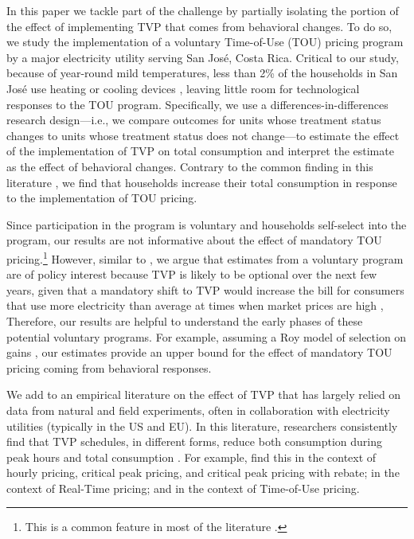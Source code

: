 \documentclass[12pt]{article}
\begin{document}
In this paper we tackle part of the challenge by partially isolating the portion of the effect of implementing TVP that comes from behavioral changes. To do so, we study the implementation of a voluntary Time-of-Use (TOU) pricing program by a major electricity utility serving San José, Costa Rica. Critical to our study, because of year-round mild temperatures, less than 2\% of the households in San José use heating or cooling devices \citep{ministeriodeambienteyenergiaEstudioParaCaracterizacion2019}, leaving little room for technological responses to the TOU program. Specifically, we use a differences-in-differences research design---i.e., we compare outcomes for units whose treatment status changes to units whose treatment status does not change---to estimate the effect of the implementation of TVP on total consumption and interpret the estimate as the effect of behavioral changes. Contrary to the common finding in this literature \citep{faruquiHouseholdResponseDynamic2010,minabadtke-berkowPrimerTimevariantElectricity2015,duttaLiteratureReviewDynamic2017}, we find that households increase their total consumption in response to the implementation of TOU pricing.

Since participation in the program is voluntary and households self-select into the program, our results are not informative about the effect of mandatory TOU pricing.\footnote{This is a common feature in most of the literature \citep{faruquiHouseholdResponseDynamic2010,minabadtke-berkowPrimerTimevariantElectricity2015}.} However, similar to \citet{allcottRethinkingRealtimeElectricity2011}, we argue that estimates from a voluntary program are of policy interest because TVP is likely to be optional over the next few years, given that a mandatory shift to TVP would increase the bill for consumers that use more electricity than average at times when market prices are high \citep{borensteinWealthTransfersLarge2007},  Therefore, our results are helpful to understand the early phases of these potential voluntary programs. For example, assuming a Roy model of selection on gains \citep{heckmanChapter70Econometric2007}, our estimates provide an upper bound for the effect of mandatory TOU pricing coming from behavioral responses.

We add to an empirical literature on the effect of TVP that has largely relied on data from natural and field experiments, often in collaboration with electricity utilities (typically in the US and EU). In this literature, researchers consistently find that TVP schedules, in different forms, reduce both consumption during peak hours and total consumption \citep{faruquiHouseholdResponseDynamic2010,minabadtke-berkowPrimerTimevariantElectricity2015}. For example, \citet{wolakResidentialCustomersRespond2011} find this in the context of hourly pricing, critical peak pricing, and critical peak pricing with rebate; \citet{allcottRethinkingRealtimeElectricity2011} in the context of Real-Time pricing; and \citet{jessoeUnderstandingRolePrice2014} in the context of Time-of-Use pricing.
\end{document}
